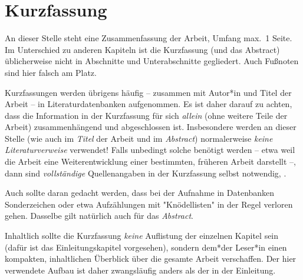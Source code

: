 \chapter{Kurzfassung}

An dieser Stelle steht eine Zusammenfassung der Arbeit, Umfang
max.\ 1 Seite. Im Unterschied zu anderen Kapiteln ist die
Kurzfassung (und das Abstract) üblicherweise nicht in Abschnitte
und Unterabschnitte gegliedert. 
Auch Fußnoten sind hier falsch am Platz.

Kurzfassungen werden übrigens häufig -- zusammen mit Autor*in und Titel
der Arbeit -- %
in Literaturdatenbanken aufgenommen. Es ist daher darauf zu
achten, dass die Information in der Kurzfassung für sich 
\emph{allein} (\dah ohne weitere Teile der Arbeit) zusammenhängend und
abgeschlossen ist. Insbesondere werden an dieser Stelle (wie \ua
auch im \emph{Titel} der Arbeit und im \emph{Abstract})
normalerweise \emph{keine Literaturverweise} verwendet! Falls
unbedingt solche benötigt werden -- etwa weil die Arbeit eine
Weiterentwicklung einer bestimmten, früheren Arbeit darstellt --,
dann sind \emph{vollständige} Quellenangaben in der Kurzfassung
selbst notwendig, .

Auch sollte daran gedacht werden, dass bei der Aufnahme in Datenbanken
Sonderzeichen oder etwa Aufzählungen mit "Knödellisten" in der
Regel verloren gehen. Dasselbe gilt natürlich auch für das 
\emph{Abstract}.


Inhaltlich sollte die Kurzfassung \emph{keine} Auflistung der
einzelnen Kapitel sein (dafür ist das Einleitungskapitel
vorgesehen), sondern dem*der Leser*in einen kompakten, inhaltlichen
Überblick über die gesamte Arbeit verschaffen. Der hier verwendete
Aufbau ist daher zwangsläufig anders als der in der Einleitung.
